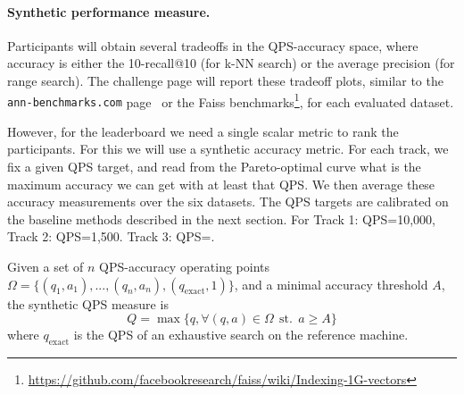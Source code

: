 \fi




\paragraph{Synthetic performance measure.}


Participants will obtain several tradeoffs in the QPS-accuracy space,
where accuracy is either the 10-recall@10 (for k-NN search) or the
average precision (for range search).  
The challenge page will report
these tradeoff plots, similar to the {\tt ann-benchmarks.com}
page~\cite{Benchmark} or the Faiss benchmarks\footnote{\url{https://github.com/facebookresearch/faiss/wiki/Indexing-1G-vectors}},
for each evaluated dataset.

However, for the leaderboard we need a single scalar metric to rank the participants. 
For this we will use a synthetic accuracy metric. 
For each track, we fix a given QPS target, and read from the Pareto-optimal curve what is the maximum accuracy we can get with at least that QPS. 
%
We then average these accuracy measurements over the six datasets. 
The QPS targets are calibrated on the baseline methods described in the next section. 
For Track 1: QPS=10,000, Track 2: QPS=1,500. Track 3: QPS=.


\iffalse 

\begin{definition}
  \label{def:syntheticmetric}
  Given a set of $n$ QPS-accuracy operating points $\Omega = \{(q_1, a_1), ..., (q_n, a_n), (q_\mathrm{exact}, 1)\}$, 
  and a minimal accuracy threshold $A$,   the synthetic QPS measure is 
  \[
Q =  \max \{ q, \forall (q, a)\in \Omega \ \ \mathrm{st.}\ \  a\ge A \}
  \]
  where $q_\mathrm{exact}$ is the QPS of an exhaustive search on the reference machine.
\end{definition}


